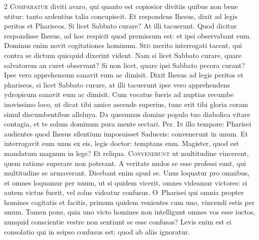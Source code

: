 \begin{multicols*}{2}
\lettrine[lines=2]{\zallmancaps \color{Blue} C}{omparatur} diviti avaro, qui quanto est copiosior divitiis quibus non bene utitur: tanto ardentius talia concupiscit. Et respondens Ihesus, dixit ad legis peritos et Phariseos. Si licet Sabbato curare? At illi tacuerunt. Quod dicitur respondisse Ihesus, ad hoc respicit quod premissum est: et ipsi observabant eum. Dominus enim novit cogitationes hominum.
\lettrine[lines=2]{\zallmancaps \color{Red} S}{ed} merito interrogati tacent, qui contra se dictum quicquid dixerint vident. Nam si licet Sabbato curare, quare salvatorem an curet observant? Si non licet, quare ipsi Sabbato pecora curant? Ipse vero apprehensum sanavit eum ac dimisit.
 Dixit Ihesus ad legis peritos et phariseos, si licet Sabbato curare, at illi tacuerunt ipse vero apprehendens ydropicum sanavit eum ac dimisit.
 Cum vocatus fueris ad nuptias recumbe inovissimo loco, ut dicat tibi amice ascende superius, tunc erit tibi gloria coram simul discumbentibus alleluya.%
\lettrine[lines=2]{\zallmancaps \color{Blue} D}{a} quesumus domine populo tuo diabolica vitare contagia, et te solum dominum pura mente
sectari. Per.
\lettrine[lines=2]{\zallmancaps \color{Red} I}{n} illo tempore: Pharisei audientes quod Ihesus silentium imposuisset Saduceis: convenerunt in unum. Et interrogavit eum unus ex eis, legis doctor: temptans eum. Magister, quod est mandatum magnum in lege? Et reliqua.
\lettrine[lines=2]{\zallmancaps \color{Blue} C}{onvenerunt} ut multitudine vincerent, quem ratione superare non poterant. A veritate nudos se esse professi sunt, qui multitudine se armaverant. Dicebant enim apud se. Unus loquatur pro omnibus, et omnes loquamur per unum, ut si quidem vicerit, omnes videamur victores: si autem victus fuerit, vel solus videatur confusus.
\lettrine[lines=2]{\zallmancaps \color{Red} O}{}\ Pharisei qui omnia propter homines cogitatis et facitis, primum quidem venientes cum uno, vincendi estis per unum. Tamen pone, quia uno victo homines non intelligunt omnes vos esse iuctos, nunquid conscientie vestre non sentiunt se esse confusas? Levis enim est ei consolatio qui in seipso confusus est: quod ab aliis ignoratur.

\end{multicols*}
